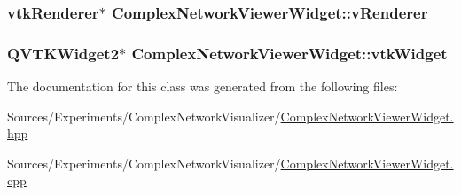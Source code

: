\hypertarget{class_complex_network_viewer_widget_a37cb73cbf45ace9c67986fb29c0d44d7}{
\subsubsection[{v\+Renderer}]{\setlength{\rightskip}{0pt plus 5cm}vtk\+Renderer$\ast$ Complex\+Network\+Viewer\+Widget\+::v\+Renderer\hspace{0.3cm}{\ttfamily [private]}}}\label{class_complex_network_viewer_widget_a37cb73cbf45ace9c67986fb29c0d44d7}
\hypertarget{class_complex_network_viewer_widget_a3cc8ef618cd408d81e936c3a65e093cb}{
\subsubsection[{vtk\+Widget}]{\setlength{\rightskip}{0pt plus 5cm}Q\+V\+T\+K\+Widget2$\ast$ Complex\+Network\+Viewer\+Widget\+::vtk\+Widget\hspace{0.3cm}{\ttfamily [private]}}}\label{class_complex_network_viewer_widget_a3cc8ef618cd408d81e936c3a65e093cb}


The documentation for this class was generated from the following files\+:\begin{DoxyCompactItemize}
\item 
Sources/\+Experiments/\+Complex\+Network\+Visualizer/\hyperlink{_complex_network_viewer_widget_8hpp}{Complex\+Network\+Viewer\+Widget.\+hpp}\item 
Sources/\+Experiments/\+Complex\+Network\+Visualizer/\hyperlink{_complex_network_viewer_widget_8cpp}{Complex\+Network\+Viewer\+Widget.\+cpp}\end{DoxyCompactItemize}
